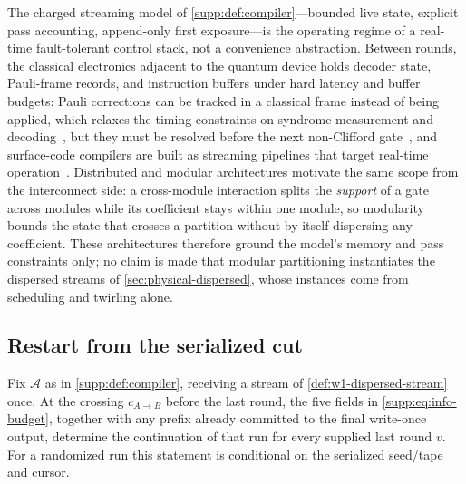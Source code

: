 \begin{remark}
\label{rem:streaming-grounding}
The charged streaming model of \cref{supp:def:compiler}---bounded live
state, explicit pass accounting, append-only first exposure---is the
operating regime of a real-time fault-tolerant control stack, not a
convenience abstraction.  Between rounds, the classical electronics
adjacent to the quantum device holds decoder state, Pauli-frame
records, and instruction buffers under hard latency and buffer
budgets: Pauli corrections can be tracked in a classical frame instead of
being applied, which relaxes the timing constraints on syndrome
measurement and decoding~\cite{riesebos2017pauli}, but they must be
resolved before the next non-Clifford gate~\cite{knill2005realistically},
and surface-code compilers are built as streaming pipelines that target
real-time operation~\cite{watkins2024surfacecode}.  Distributed
and modular architectures motivate the same scope from the
interconnect side: a cross-module interaction splits the
\emph{support} of a gate across modules while its coefficient stays
within one module, so modularity bounds the state that crosses a
partition without by itself dispersing any coefficient.  These
architectures therefore ground the model's memory and pass
constraints only; no claim is made that modular partitioning
instantiates the dispersed streams of \cref{sec:physical-dispersed},
whose instances come from scheduling and twirling alone.
\end{remark}



\subsection{Restart from the serialized cut}

\begin{lemma}
\label{app:lem:reconstruction}
Fix $\mathcal A$ as in \cref{supp:def:compiler}, receiving a stream of
\cref{def:w1-dispersed-stream} once.  At the crossing $c_{A\to B}$ before
the last round, the five fields in \eqref{supp:eq:info-budget}, together
with any prefix already committed to the final write-once output, determine
the continuation of that run for every supplied last round $v$.  For a randomized run this statement is conditional on the serialized
seed/tape and cursor.
\end{lemma}

